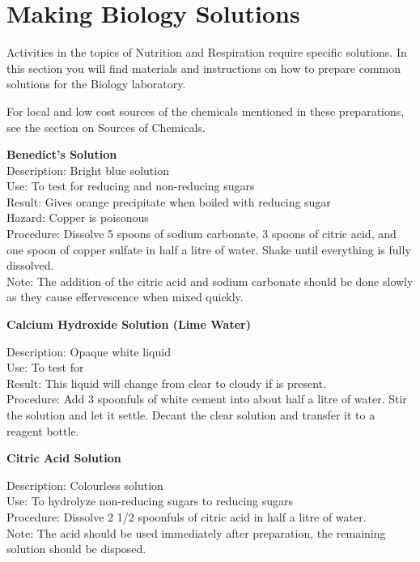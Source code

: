 \chapter{Making Biology Solutions}
Activities in the topics of Nutrition and Respiration require specific solutions. In this section you will find materials and instructions on how to prepare common solutions for the Biology laboratory.

For local and low cost sources of the chemicals mentioned in these preparations, see the section on Sources of Chemicals.

\begin{flushleft}
\textbf{Benedict's Solution}\\
Description: Bright blue solution\\
Use: To test for reducing and non-reducing sugars\\
Result: Gives orange precipitate when boiled with reducing sugar\\
Hazard: Copper is poisonous\\
Procedure: Dissolve 5 spoons of sodium carbonate, 3 spoons of citric acid,
and one spoon of copper sulfate in half a litre of water. Shake until everything is fully dissolved.\\Note: The addition of the citric acid and sodium carbonate should be done slowly as they cause effervescence when mixed quickly.
\end{flushleft}

\begin{flushleft}
\textbf{Calcium Hydroxide Solution (Lime Water)}
\end{flushleft}
\vspace{-10pt}
Description: Opaque white liquid\\
Use: To test for \\
Result: This liquid will change from clear to cloudy if  is present.\\
Procedure: Add 3 spoonfuls of white cement into about half a litre of water. Stir the solution and let it settle. Decant the clear solution and transfer it to a reagent bottle.\\

\begin{flushleft}
\textbf{Citric Acid Solution}
\end{flushleft}
\vspace{-10pt}
Description: Colourless solution\\
Use: To hydrolyze non-reducing sugars to reducing sugars\\
Procedure: Dissolve 2 1/2 spoonfuls of citric acid in half a litre of water.\\
Note: The acid should be used immediately after preparation, the remaining solution should be disposed.

